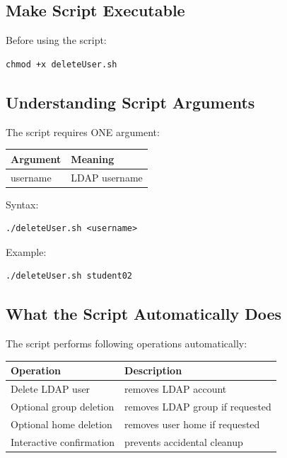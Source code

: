\documentclass[11pt]{article}
\begin{document}
\subsection{Make Script Executable}
\label{sec:org7a40f40}

Before using the script:

\begin{verbatim}
chmod +x deleteUser.sh
\end{verbatim}
\subsection{Understanding Script Arguments}
\label{sec:org8ad224c}

The script requires ONE argument:

\begin{center}
\begin{tabular}{ll}
Argument & Meaning\\
\hline
username & LDAP username\\
\end{tabular}
\end{center}

Syntax:

\begin{verbatim}
./deleteUser.sh <username>
\end{verbatim}

Example:

\begin{verbatim}
./deleteUser.sh student02
\end{verbatim}
\subsection{What the Script Automatically Does}
\label{sec:orgc5b264a}

The script performs following operations automatically:

\begin{center}
\begin{tabular}{ll}
Operation & Description\\
\hline
Delete LDAP user & removes LDAP account\\
Optional group deletion & removes LDAP group if requested\\
Optional home deletion & removes user home if requested\\
Interactive confirmation & prevents accidental cleanup\\
\end{tabular}
\end{center}
\end{document}
